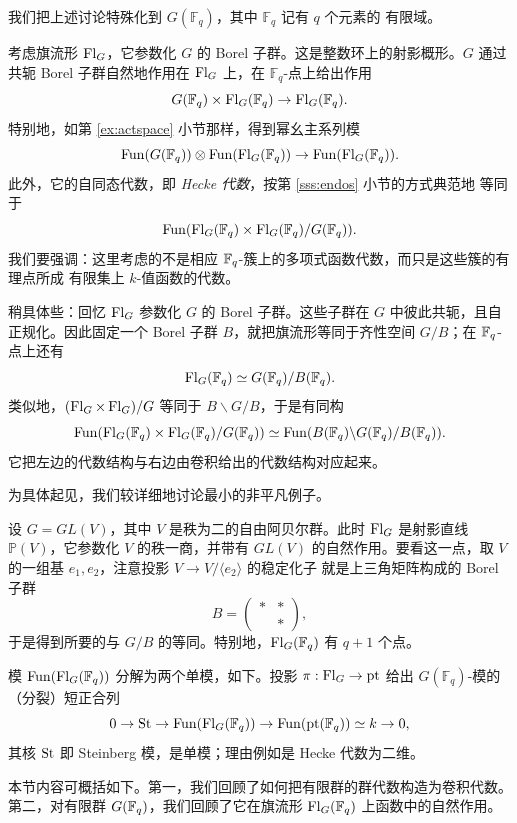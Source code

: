 \ssszh 我们把上述讨论特殊化到 $G(\mathbb{F}_q)$，其中 $\mathbb{F}_q$ 记有 $q$ 个元素的
有限域。

考虑旗流形 $\operatorname{Fl}_G$，它参数化 $G$ 的 Borel 子群。这是整数环上的射影概形。$G$ 通过共轭
Borel 子群自然地作用在 $\operatorname{Fl}_G$ 上，在 $\mathbb{F}_q$-点上给出作用
%
\[
G(\mathbb{F}_q) \times \operatorname{Fl}_G(\mathbb{F}_q) \rightarrow \operatorname{Fl}_G(\mathbb{F}_q).
\]
%
特别地，如第 \ref{ex:actspace} 小节那样，得到幂幺主系列模
%
\[
\operatorname{Fun}(G(\mathbb{F}_q)) \otimes \operatorname{Fun}(\operatorname{Fl}_G(\mathbb{F}_q)) \rightarrow
\operatorname{Fun}(\operatorname{Fl}_G(\mathbb{F}_q)).
\]
%
此外，它的自同态代数，即 {\em Hecke 代数}，按第 \ref{sss:endos} 小节的方式典范地
等同于
%
\[
\operatorname{Fun}( \operatorname{Fl}_G(\mathbb{F}_q) \times \operatorname{Fl}_G(\mathbb{F}_q) / G(\mathbb{F}_q)).
\]
%
我们要强调：这里考虑的不是相应 $\mathbb{F}_q$-簇上的多项式函数代数，而只是这些簇的有理点所成
有限集上 $k$-值函数的代数。

\ssszh 稍具体些：回忆 $\operatorname{Fl}_G$ 参数化 $G$ 的 Borel 子群。这些子群在 $G$ 中彼此共轭，且自
正规化。因此固定一个 Borel 子群 $B$，就把旗流形等同于齐性空间 $G/B$；在 $\mathbb{F}_q$-点上还有
%
\[
\operatorname{Fl}_G(\mathbb{F}_q) \simeq G(\mathbb{F}_q)/B(\mathbb{F}_q).
\]
%
类似地，$(\operatorname{Fl}_G \times \operatorname{Fl}_G) /G$ 等同于 $B \backslash G / B$，于是有同构
%
\[
\operatorname{Fun}( \operatorname{Fl}_G(\mathbb{F}_q) \times \operatorname{Fl}_G(\mathbb{F}_q) / G(\mathbb{F}_q)) \simeq
\operatorname{Fun}( B(\mathbb{F}_q) \backslash G(\mathbb{F}_q) / B(\mathbb{F}_q)).
\]
%
它把左边的代数结构与右边由卷积给出的代数结构对应起来。

\ssszh 为具体起见，我们较详细地讨论最小的非平凡例子。

\begin{ex} 设 $G = GL(V)$，其中 $V$ 是秩为二的自由阿贝尔群。此时 $\operatorname{Fl}_G$ 是射影直线
$\mathbb{P}(V)$，它参数化 $V$ 的秩一商，并带有 $GL(V)$ 的自然作用。要看这一点，取
$V$ 的一组基 $e_1, e_2$，注意投影 $V \rightarrow V / \langle e_2 \rangle$ 的稳定化子
就是上三角矩阵构成的 Borel 子群
%
\[
B =\begin{pmatrix} * & * \\ & * \end{pmatrix},
\]
%
于是得到所要的与 $G/B$ 的等同。特别地，$\operatorname{Fl}_G(\mathbb{F}_q)$ 有 $q+1$ 个点。

模 $\operatorname{Fun}(\operatorname{Fl}_G(\mathbb{F}_q))$ 分解为两个单模，如下。投影 $\pi: \operatorname{Fl}_G \rightarrow \operatorname{pt}$
给出 $G(\mathbb{F}_q)$-模的（分裂）短正合列
%
\[
0 \rightarrow \operatorname{St} \rightarrow \operatorname{Fun}(\operatorname{Fl}_G(\mathbb{F}_q)) \rightarrow
\operatorname{Fun}(\operatorname{pt}(\mathbb{F}_q)) \simeq k \rightarrow 0,
\]
%
其核 $\operatorname{St}$ 即 Steinberg 模，是单模；理由例如是 Hecke 代数为二维。
\end{ex}

\ssszh 本节内容可概括如下。第一，我们回顾了如何把有限群的群代数构造为卷积代数。
第二，对有限群 $G(\mathbb{F}_q)$，我们回顾了它在旗流形 $\operatorname{Fl}_G(\mathbb{F}_q)$ 上函数中的自然作用。
